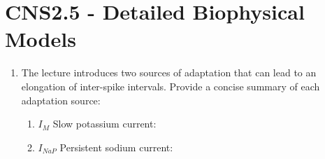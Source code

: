 \documentclass[11pt,letterpaper]{article}
\begin{document}
\section{CNS2.5 - Detailed Biophysical Models}
\begin{enumerate}
    \item The lecture introduces two sources of adaptation that can lead to an elongation of inter-spike intervals. Provide a concise summary of each adaptation source:
    \begin{enumerate}
        \item $I_M$ Slow potassium current:
        \vspace{3 cm}
        \item $I_{NaP}$ Persistent sodium current: 
    \end{enumerate}
\end{enumerate}

\pagebreak
\end{document}

